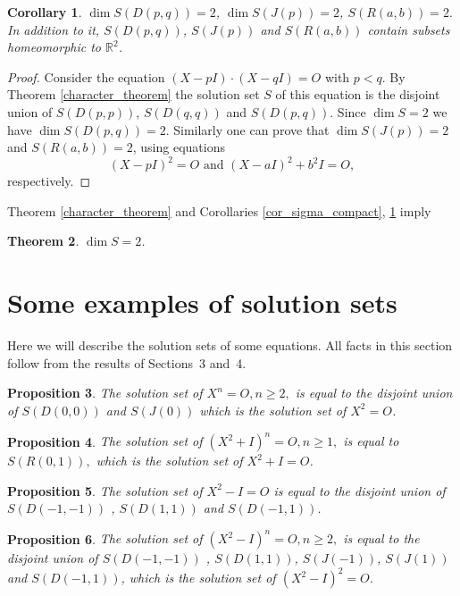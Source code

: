 \documentclass[12pt]{amsart}
\theoremstyle{plain}
\newtheorem{thm}{Theorem}[section]
\newtheorem{cor}[thm]{Corollary}
\newtheorem{prop}[thm]{Proposition}
\theoremstyle{definition}
\begin{document}
\begin{cor} \label{cor_about_S}$\dim S(D(p,q)) = 2$, $\dim S(J(p)) = 2$, $S(R(a,b)) = 2.$ In addition to it, $S(D(p,q))$, $S(J(p))$ and $S(R(a,b))$ contain subsets homeomorphic to $\mathbb R^2$.
\end{cor}
\begin{proof}\label{dimension of S} Consider the equation $(X-pI)\cdot (X-qI) =O$ with $p < q$.
By Theorem \ref{character_theorem} the solution set $S$ of this  equation 
is the disjoint union of $S(D(p,p))$, $S(D(q,q))$ and $S(D(p,q))$.
Since $\dim S = 2$ we have $\dim S(D(p,q)) = 2$.
Similarly one can prove that $\dim S(J(p)) = 2$ and $S(R(a,b)) = 2$, using equations 
$$(X-pI)^2=O\mbox{ and } (X-aI)^2+b^2I = O,$$ respectively.
\end{proof}

Theorem \ref{character_theorem} and Corollaries \ref{cor_sigma_compact}, \ref{cor_about_S} imply
\begin{thm} \label{theorem_dim} $\dim S = 2$.
\end{thm}




\section{Some examples of solution sets}

Here we will describe the solution sets of some equations. All facts in this section follow from the results of Sections~3 and~4.

\begin{prop} The solution set of $X^n =O, n \geq 2,$ is equal to the disjoint union of 
$S(D(0,0))$ and $S(J(0))$ which is  
the solution set of  $X^2 =O$.
\end{prop}

\begin{prop} The solution set of $(X^2 +I)^n=O, n \geq 1,$ is equal to 
$S(R(0,1)),$  which is  
the solution set of  $X^2  +I=O$.
\end{prop}

\begin{prop} The solution set of $X^2 -I =O$ is equal to the disjoint union of 
$S(D(-1,-1))$ , $S(D(1,1))$ and $S(D(-1,1))$.  
\end{prop}

\begin{prop} The solution set of $(X^2 -I)^n =O, n \geq 2,$ is equal to the disjoint union of 
$S(D(-1,-1))$ , $S(D(1,1))$, $S(J(-1))$, $S(J(1))$ and $S(D(-1,1))$, which is the solution set of 
$(X^2 -I)^2 =O$.  
\end{prop}
\end{document}

